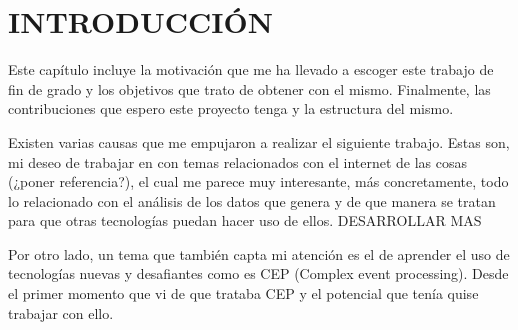 \documentclass[spanish,twoside,openright,12pt,a4paper]{book}
\begin{document}
\mainmatter %

\chapter{INTRODUCCIÓN}

Este capítulo incluye la motivación que me ha llevado a escoger este trabajo de fin de grado y los objetivos que trato de obtener con el mismo. Finalmente, las contribuciones que espero este proyecto tenga y la estructura del mismo.

Existen varias causas que me empujaron a realizar el siguiente trabajo. Estas son, mi deseo de trabajar en con temas relacionados con el internet de las cosas (¿poner referencia?), el cual me parece muy interesante, más concretamente, todo lo relacionado con el análisis de los datos que genera y de que manera se tratan para que otras tecnologías puedan hacer uso de ellos. DESARROLLAR MAS

Por otro lado, un tema que también capta mi atención es el de aprender el uso de tecnologías nuevas y desafiantes como es CEP (Complex event processing). Desde el primer momento que vi de que trataba CEP y el potencial que tenía quise trabajar con ello. 
\end{document}
